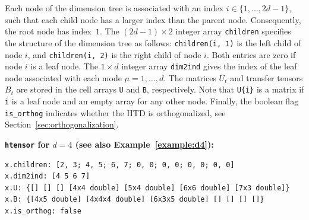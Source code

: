 \documentclass[11pt, a4paper]{article}
\begin{document}
Each node of the dimension tree is associated with an index $i \in \{1,\ldots,2d-1\}$, such that each child node 
has a larger index than the parent node.
Consequently, the root node has index~$1$. The $(2d-1)\times 2$ integer array {\tt children}
specifies the structure of the dimension tree as follows: \texttt{children(i, 1)} is the left child of node $i$, and
\texttt{children(i, 2)} is the right child of node $i$. Both entries are zero if node $i$ is a leaf node.
The $1 \times d$ integer array \texttt{dim2ind} gives the index
of the leaf node associated with each mode $\mu=1, \ldots, d$.
The matrices $U_t$ and transfer tensors $B_t$ are stored in the cell
arrays \texttt{U} and \texttt{B}, respectively. Note that \texttt{U\{i\}} is a matrix if
\texttt{i} is a leaf node and an empty array for any other node.
Finally, the boolean flag \texttt{is\_orthog} indicates whether the HTD is
orthogonalized, see Section~\ref{sec:orthogonalization}.
%
\begin{framed}\noindent
\textbf{\texttt{htensor} for $d = 4$ (see also Example~\ref{example:d4}):}\\
\vspace{-3ex} 
\begin{verbatim}
x.children: [2, 3; 4, 5; 6, 7; 0, 0; 0, 0; 0, 0; 0, 0]
x.dim2ind: [4 5 6 7]
x.U: {[] [] [] [4x4 double] [5x4 double] [6x6 double] [7x3 double]}
x.B: {[4x5 double] [4x4x4 double] [6x3x5 double] [] [] [] []}
x.is_orthog: false
\end{verbatim}
\end{framed}
\end{document}
